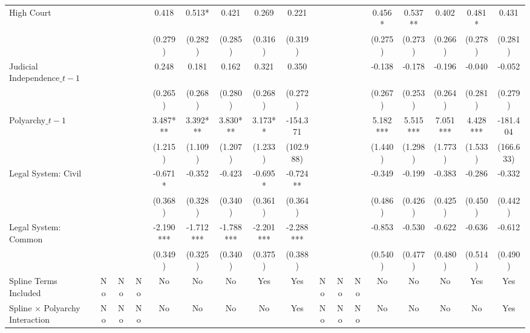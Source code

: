\begin{tabular}{lcccccccccccccccc}
High Court
&  &  &  & 0.418 & 0.513* & 0.421 & 0.269 & 0.221
&  &  &  & 0.456* & 0.537** & 0.402 & 0.481* & 0.431 \\
\vspace{0.1cm}
&  &  &  & (0.279) & (0.282) & (0.285) & (0.316) & (0.319)
&  &  &  & (0.275) & (0.273) & (0.266) & (0.278) & (0.281) \\

Judicial Independence$\_{t-1}$
&  &  &  & 0.248 & 0.181 & 0.162 & 0.321 & 0.350
&  &  &  & -0.138 & -0.178 & -0.196 & -0.040 & -0.052 \\
\vspace{0.5cm}
&  &  &  & (0.265) & (0.268) & (0.280) & (0.268) & (0.272)
&  &  &  & (0.267) & (0.253) & (0.264) & (0.281) & (0.279) \\

Polyarchy$\_{t-1}$
&  &  &  & 3.487*** & 3.392*** & 3.830*** & 3.173** & -154.371
&  &  &  & 5.182*** & 5.515*** & 7.051*** & 4.428*** & -181.404 \\
\vspace{0.1cm}
&  &  &  & (1.215) & (1.109) & (1.207) & (1.233) & (102.988)
&  &  &  & (1.440) & (1.298) & (1.773) & (1.533) & (166.633) \\

Legal System: Civil
&  &  &  & -0.671* & -0.352 & -0.423 & -0.695* & -0.724**
&  &  &  & -0.349 & -0.199 & -0.383 & -0.286 & -0.332 \\
\vspace{0.1cm}
&  &  &  & (0.368) & (0.328) & (0.340) & (0.361) & (0.364)
&  &  &  & (0.486) & (0.426) & (0.425) & (0.450) & (0.442) \\

Legal System: Common
&  &  &  & -2.190*** & -1.712*** & -1.788*** & -2.201*** & -2.288***
&  &  &  & -0.853 & -0.530 & -0.622 & -0.636 & -0.612 \\
\vspace{0.5cm}
&  &  &  & (0.349) & (0.325) & (0.340) & (0.375) & (0.388)
&  &  &  & (0.540) & (0.477) & (0.480) & (0.514) & (0.490) \\



Spline Terms Included
& No & No & No & No & No & No & Yes & Yes
& No & No & No & No & No & No & Yes & Yes \\

\vspace{0.1cm}Spline $\times$ Polyarchy Interaction
& No & No & No & No & No & No & No & Yes
& No & No & No & No & No & No & No & Yes \\

\bottomrule

\end{tabular}